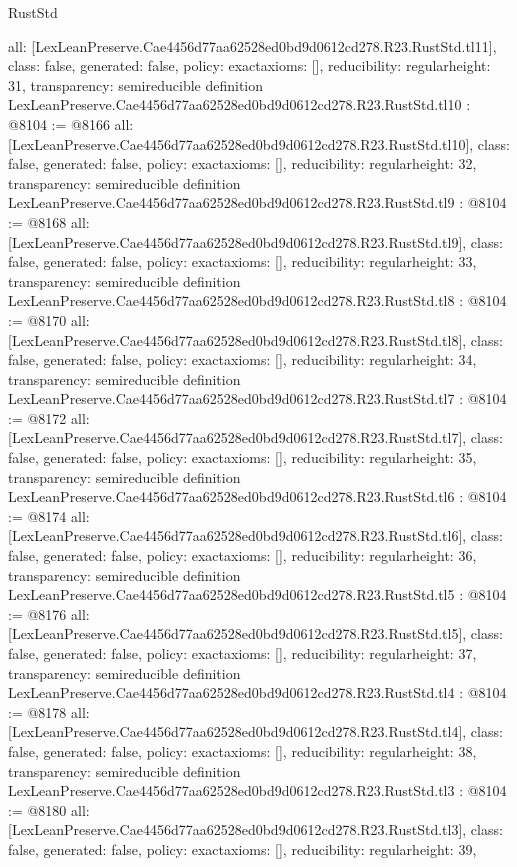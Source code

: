 \begin{lexlean}{RustStd}
\begin{coremodule}
{  all: [LexLeanPreserve.Cae4456d77aa62528ed0bd9d0612cd278.R23.RustStd.tl11],
  class: false,
  generated: false,
  policy: exact{axioms: []},
  reducibility: regular{height: 31},
  transparency: semireducible
}
definition LexLeanPreserve.Cae4456d77aa62528ed0bd9d0612cd278.R23.RustStd.tl10 : @8104 := @8166 {
  all: [LexLeanPreserve.Cae4456d77aa62528ed0bd9d0612cd278.R23.RustStd.tl10],
  class: false,
  generated: false,
  policy: exact{axioms: []},
  reducibility: regular{height: 32},
  transparency: semireducible
}
definition LexLeanPreserve.Cae4456d77aa62528ed0bd9d0612cd278.R23.RustStd.tl9 : @8104 := @8168 {
  all: [LexLeanPreserve.Cae4456d77aa62528ed0bd9d0612cd278.R23.RustStd.tl9],
  class: false,
  generated: false,
  policy: exact{axioms: []},
  reducibility: regular{height: 33},
  transparency: semireducible
}
definition LexLeanPreserve.Cae4456d77aa62528ed0bd9d0612cd278.R23.RustStd.tl8 : @8104 := @8170 {
  all: [LexLeanPreserve.Cae4456d77aa62528ed0bd9d0612cd278.R23.RustStd.tl8],
  class: false,
  generated: false,
  policy: exact{axioms: []},
  reducibility: regular{height: 34},
  transparency: semireducible
}
definition LexLeanPreserve.Cae4456d77aa62528ed0bd9d0612cd278.R23.RustStd.tl7 : @8104 := @8172 {
  all: [LexLeanPreserve.Cae4456d77aa62528ed0bd9d0612cd278.R23.RustStd.tl7],
  class: false,
  generated: false,
  policy: exact{axioms: []},
  reducibility: regular{height: 35},
  transparency: semireducible
}
definition LexLeanPreserve.Cae4456d77aa62528ed0bd9d0612cd278.R23.RustStd.tl6 : @8104 := @8174 {
  all: [LexLeanPreserve.Cae4456d77aa62528ed0bd9d0612cd278.R23.RustStd.tl6],
  class: false,
  generated: false,
  policy: exact{axioms: []},
  reducibility: regular{height: 36},
  transparency: semireducible
}
definition LexLeanPreserve.Cae4456d77aa62528ed0bd9d0612cd278.R23.RustStd.tl5 : @8104 := @8176 {
  all: [LexLeanPreserve.Cae4456d77aa62528ed0bd9d0612cd278.R23.RustStd.tl5],
  class: false,
  generated: false,
  policy: exact{axioms: []},
  reducibility: regular{height: 37},
  transparency: semireducible
}
definition LexLeanPreserve.Cae4456d77aa62528ed0bd9d0612cd278.R23.RustStd.tl4 : @8104 := @8178 {
  all: [LexLeanPreserve.Cae4456d77aa62528ed0bd9d0612cd278.R23.RustStd.tl4],
  class: false,
  generated: false,
  policy: exact{axioms: []},
  reducibility: regular{height: 38},
  transparency: semireducible
}
definition LexLeanPreserve.Cae4456d77aa62528ed0bd9d0612cd278.R23.RustStd.tl3 : @8104 := @8180 {
  all: [LexLeanPreserve.Cae4456d77aa62528ed0bd9d0612cd278.R23.RustStd.tl3],
  class: false,
  generated: false,
  policy: exact{axioms: []},
  reducibility: regular{height: 39},
}
\end{coremodule}
\end{lexlean}
